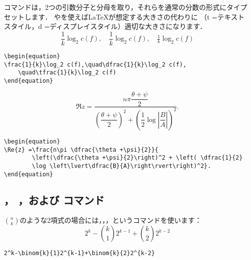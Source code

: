 コマンドは，2つの引数\mdash{}分子と分母\mdash{}を取り，それらを通常の分数の形式にタイプセットします．
やを使えば\LaTeX{}が想定する大きさの代わりに
（t =テキストスタイル，d =ディスプレイスタイル）適切な大きさになります．
\begin{equation}
\frac{1}{k}\log_2 c(f),\quad\dfrac{1}{k}\log_2 c(f),\quad\tfrac{1}{k}\log_2 c(f)
\end{equation}
\begin{verbatim}
\begin{equation}
\frac{1}{k}\log_2 c(f),\quad\dfrac{1}{k}\log_2 c(f),
    \quad\tfrac{1}{k}\log_2 c(f)
\end{equation}
\end{verbatim}
\begin{equation}
\Re{z} =\frac{n\pi \dfrac{\theta +\psi}{2}}{
        \left(\dfrac{\theta +\psi}{2}\right)^2 + \left( \dfrac{1}{2}
        \log \left\lvert\dfrac{B}{A}\right\rvert\right)^2}.
\end{equation}
\begin{verbatim}
\begin{equation}
\Re{z} =\frac{n\pi \dfrac{\theta +\psi}{2}}{
        \left(\dfrac{\theta +\psi}{2}\right)^2 + \left( \dfrac{1}{2}
        \log \left\lvert\dfrac{B}{A}\right\rvert\right)^2}.
\end{equation}
\end{verbatim}

\subsection{， ，および
        コマンド}

$\binom{n}{k}$のような2項式の場合には，，，というコマンドを使います：
\begin{equation}
2^k-\binom{k}{1}2^{k-1}+\binom{k}{2}2^{k-2}
\end{equation}
\begin{verbatim}
2^k-\binom{k}{1}2^{k-1}+\binom{k}{2}2^{k-2}
\end{verbatim}

